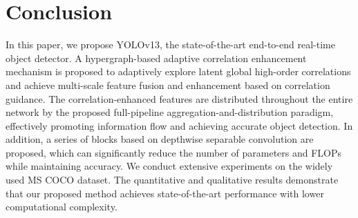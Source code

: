 \section{Conclusion}
In this paper, we propose YOLOv13, the state-of-the-art end-to-end real-time object detector. A hypergraph-based adaptive correlation enhancement mechanism is proposed to adaptively explore latent global high-order correlations and achieve multi-scale feature fusion and enhancement based on correlation guidance. The correlation-enhanced features are distributed throughout the entire network by the proposed full-pipeline aggregation-and-distribution paradigm, effectively promoting information flow and achieving accurate object detection. In addition, a series of blocks based on depthwise separable convolution are proposed, which can significantly reduce the number of parameters and FLOPs while maintaining accuracy. We conduct extensive experiments on the widely used MS COCO dataset. The quantitative and qualitative results demonstrate that our proposed method achieves state-of-the-art performance with lower computational complexity.